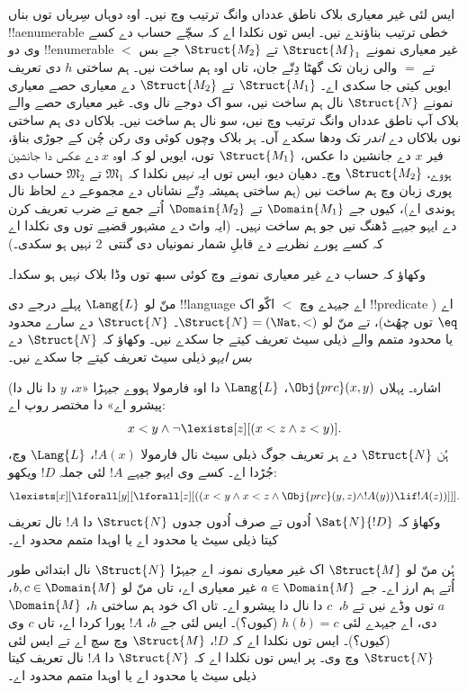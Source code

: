\documentclass[../../../include/open-logic-section]{subfiles}
\begin{document}
ایس لئی غیر معیاری بلاک ناطق عدداں وانگ ترتیب وچ نیں۔ اوہ دوہاں سِریاں توں بناں !!a{enumerable} خطی ترتیب بناؤندے نیں۔ ایس توں نکلدا اے کہ سچّے حساب دے کسے وی دو !!{enumerable} غیر معیاری نمونے $\Struct{M}_1$ تے $\Struct{M_2}$ جے بس $<$ تے $=$ والی زبان تک گھٹا دِتّے جان، تاں اوہ ہم ساخت نیں۔ ہم ساختی $h$ دی تعریف ایویں کیتی جا سکدی اے۔ $\Struct{M_1}$ تے $\Struct{M_2}$ دے معیاری حصے معیاری نمونے $\Struct{N}$ نال ہم ساخت نیں، سو اک دوجے نال وی۔ غیر معیاری حصے والے بلاک آپ ناطق عدداں وانگ ترتیب وچ نیں، سو  نال ہم ساخت نیں۔ بلاکاں دی ہم ساختی نوں بلاکاں دے \emph{اندر} تک ودھا سکدے آں۔ ہر بلاک وچوں کوئی وی رکن چُن کے جوڑی بناؤ، فیر $x$ دے جانشین دا عکس، $\Struct{M_1}$ توں، ایویں لو کہ اوہ $x$ دے عکس دا جانشین ہووے، $\Struct{M_2}$ وچ۔ دھیان دیو، ایس توں ایہ \emph{نہیں} نکلدا کہ $\mathfrak{M}_1$ تے $\mathfrak{M}_2$ حساب دی پوری زبان وچ ہم ساخت نیں (ہم ساختی ہمیشہ دِتّے نشاناں دے مجموعے دے لحاظ نال ہوندی اے)، کیوں جے $\Domain{M_1}$ تے $\Domain{M_2}$ اُتے جمع تے ضرب تعریف کرن دے ایہو جیہے ڈھنگ نیں جو ہم ساخت نہیں۔ (ایہ واٹ دے مشہور قضیے توں وی نکلدا اے کہ کسے پورے نظریے دے قابلِ شمار نمونیاں دی گنتی~2 نہیں ہو سکدی۔)

\begin{prob}
وکھاؤ کہ حساب دے غیر معیاری نمونے وچ کوئی سبھ توں وڈا بلاک نہیں ہو سکدا۔
\end{prob}

\begin{prob}
منّ لو $\Lang{L}$ پہلے درجے دی !!{language} اے جیہدے وچ $<$ اکّو اک !!{predicate} اے ($\eq$ توں چھُٹ)، تے منّ لو $\Struct{N} = (\Nat,
<)$۔ $\Struct{N}$ دے سارے محدود یا محدود متمم والے ذیلی سیٹ تعریف کیتے جا سکدے نیں۔ وکھاؤ کہ $\Struct{N}$ دے \emph{بس ایہو} ذیلی سیٹ تعریف کیتے جا سکدے نیں۔

(اشارہ۔ پہلاں $\Obj{prc}(x,y)$، $\Lang{L}$ دا اوہ فارمولا ہووے جیہڑا «$x$، $y$ دا نال دا پیشرو اے» دا مختصر روپ اے:
\[
x<y \land \lnot \lexists[z][(x<z \land z < y)].
\]
ہُن $\Struct{N}$ دے ہر تعریف جوگ ذیلی سیٹ نال فارمولا $!A(x)$، $\Lang{L}$ وچ، جُڑدا اے۔ کسے وی ایہو جیہے $!A$ لئی جملہ $!D$ ویکھو:
\[
\lexists[x][\lforall[y][\lforall[z][((x<y \land x<z \land \Obj{prc}(y,z)
  \land !A(y)) \lif !A(z))]]].
\]
وکھاؤ کہ $\Sat{N}{!D}$ اُدوں تے صرف اُدوں جدوں $\Struct{N}$ دا $!A$ نال تعریف کیتا ذیلی سیٹ یا محدود اے یا اوہدا متمم محدود اے۔

ہُن منّ لو $\Struct{M}$ اک غیر معیاری نمونہ اے جیہڑا $\Struct{N}$ نال ابتدائی طور اُتے ہم ارز اے۔ جے $a \in \Domain{M}$ غیر معیاری اے، تاں منّ لو $b, c \in \Domain{M}$، $a$ توں وڈے نیں تے $b$،~$c$ دا نال دا پیشرو اے۔ تاں اک خود ہم ساختی $h$، $\Domain{M}$ دی، اے جیہدے لئی $h(b)=c$ (کیوں؟)۔ ایس لئی جے $b$، $!A$ پورا کردا اے، تاں $c$ وی (کیوں؟)۔ ایس توں نکلدا اے کہ $!D$، $\Struct{M}$ وچ سچ اے تے ایس لئی $\Struct{N}$ وچ وی۔ پر ایس توں نکلدا اے کہ $\Struct{N}$ دا $!A$ نال تعریف کیتا ذیلی سیٹ یا محدود اے یا اوہدا متمم محدود اے۔
\end{prob}
\end{document}
